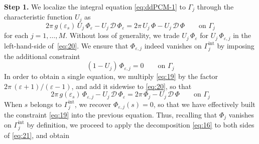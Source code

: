 {\bf Step 1.} 
We localize the integral equation \eqref{eq:ddPCM-1} to $\Gamma_j$ through the characteristic function $U_j$ as
\begin{equation}\label{eq:20}
2 \pi \, g(\varepsilon_s) \, U_j \, \Phi_{\varepsilon} - U_j \, {\mathcal{D} \, \Phi}_\varepsilon = 2 \pi \, U_j \, \Phi - U_j \, {\mathcal{D} \, \Phi} \qquad \text{on }\Gamma_j
\end{equation}
for each $j=1,\ldots,M$. 
Without loss of generality, we trade $U_j \, \Phi_\varepsilon$ for $U_j \, \Phi_{\varepsilon,j}$ in the left-hand-side of~\eqref{eq:20}.
We ensure that $\Phi_{\varepsilon,j}$ indeed vanishes on $\Gamma_j^\text{int}$ by imposing the additional constraint
\begin{equation}\label{eq:19}
(1 - U_j) \, \Phi_{\varepsilon,j}  = 0\qquad \text{on }\Gamma_j 
\end{equation}
In order to obtain a single equation, we multiply \eqref{eq:19} by the factor $2\pi \, (\varepsilon+1)/(\varepsilon-1)$, and add it sidewise to \eqref{eq:20}, so that
\begin{equation}\label{eq:21}
2 \pi \, g(\varepsilon_s) \, \Phi_{\varepsilon,j} - U_j \, {\mathcal{D} \, \Phi}_\varepsilon = 2 \pi \, \Phi_j - U_j \, {\mathcal{D} \, \Phi} \qquad \text{on }\Gamma_j
\end{equation}
When $s$ belongs to $\Gamma_j^\text{int}$, we recover $\Phi_{\varepsilon,j}(s) = 0$, so that we have effectively built the constraint \eqref{eq:19} into the previous equation. Thus, recalling that $\Phi_j$ vanishes on $\Gamma_j^\text{int}$ by definition, we proceed to apply the decomposition \eqref{eq:16} to both sides of \eqref{eq:21}, and obtain
